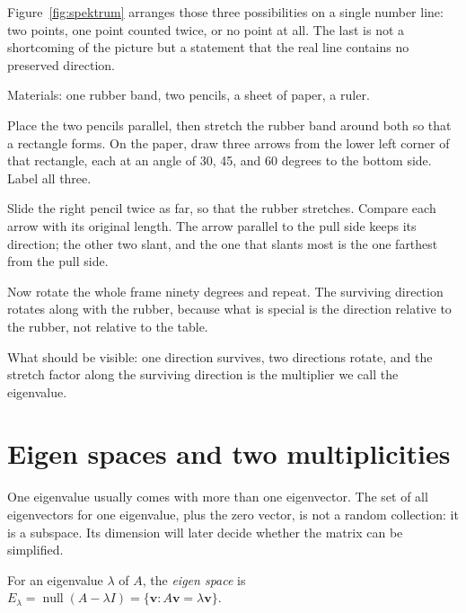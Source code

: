 Figure~\ref{fig:spektrum} arranges those three possibilities on a single number line: two points,
one point counted twice, or no point at all. The last is not a shortcoming of the picture but a
statement that the real line contains no preserved direction.

\begin{tangan}
Materials: one rubber band, two pencils, a sheet of paper, a ruler.

Place the two pencils parallel, then stretch the rubber band around both so that a rectangle
forms. On the paper, draw three arrows from the lower left corner of that rectangle, each at an
angle of 30, 45, and 60 degrees to the bottom side. Label all three.

Slide the right pencil twice as far, so that the rubber stretches. Compare each arrow with its
original length. The arrow parallel to the pull side keeps its direction; the other two slant, and
the one that slants most is the one farthest from the pull side.

Now rotate the whole frame ninety degrees and repeat. The surviving direction rotates along with
the rubber, because what is special is the direction relative to the rubber, not relative to the
table.

What should be visible: one direction survives, two directions rotate, and the stretch factor
along the surviving direction is the multiplier we call the eigenvalue.
\end{tangan}

\section{Eigen spaces and two multiplicities}

One eigenvalue usually comes with more than one eigenvector. The set of all eigenvectors for one
eigenvalue, plus the zero vector, is not a random collection: it is a subspace. Its dimension will
later decide whether the matrix can be simplified.

\begin{definisi}
For an eigenvalue $\lambda$ of $A$, the \emph{eigen space} is
$E_{\lambda}=\operatorname{null}(A-\lambda I)=\{\mathbf{v}:A\mathbf{v}=\lambda\mathbf{v}\}$.
\end{definisi}


